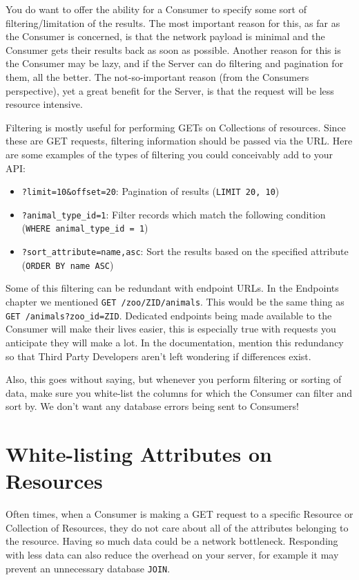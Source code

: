 \documentclass{book}
\begin{document}
You do want to offer the ability for a Consumer to specify some sort of filtering/limitation of the results. The most important reason for this, as far as the Consumer is concerned, is that the network payload is minimal and the Consumer gets their results back as soon as possible. Another reason for this is the Consumer may be lazy, and if the Server can do filtering and pagination for them, all the better. The not-so-important reason (from the Consumers perspective), yet a great benefit for the Server, is that the request will be less resource intensive.

Filtering is mostly useful for performing GETs on Collections of resources. Since these are GET requests, filtering information should be passed via the URL. Here are some examples of the types of filtering you could conceivably add to your API:

\begin{itemize}
\item \texttt{?limit=10\&offset=20}: Pagination of results (\texttt{LIMIT 20, 10})
\item \texttt{?animal\_type\_id=1}: Filter records which match the following condition (\texttt{WHERE animal\_type\_id = 1})
\item \texttt{?sort\_attribute=name,asc}: Sort the results based on the specified attribute (\texttt{ORDER BY name ASC})
\end{itemize}

Some of this filtering can be redundant with endpoint URLs. In the Endpoints chapter we mentioned \texttt{GET /zoo/ZID/animals}. This would be the same thing as \texttt{GET /animals?zoo\_id=ZID}. Dedicated endpoints being made available to the Consumer will make their lives easier, this is especially true with requests you anticipate they will make a lot. In the documentation, mention this redundancy so that Third Party Developers aren't left wondering if differences exist.

Also, this goes without saying, but whenever you perform filtering or sorting of data, make sure you white-list the columns for which the Consumer can filter and sort by. We don't want any database errors being sent to Consumers!


\section{White-listing Attributes on Resources}

Often times, when a Consumer is making a GET request to a specific Resource or Collection of Resources, they do not care about all of the attributes belonging to the resource. Having so much data could be a network bottleneck. Responding with less data can also reduce the overhead on your server, for example it may prevent an unnecessary database \texttt{JOIN}.
\end{document}
